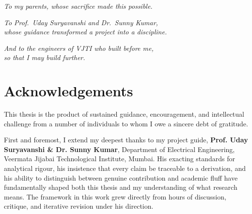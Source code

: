\documentclass[12pt, oneside, a4paper]{report}
\theoremstyle{definition}
\theoremstyle{remark}
\begin{document}

\cleardoublepage


\thispagestyle{empty}
\vspace*{4cm}

\begin{center}
  \itshape
  \large

  \emph{To my parents, whose sacrifice made this possible.}

  \vspace{0.5cm}

  \emph{To Prof.\ Uday Suryavanshi and Dr.\ Sunny Kumar,}\\
  \emph{whose guidance transformed a project into a discipline.}

  \vspace{0.5cm}

  \emph{And to the engineers of VJTI who built before me,}\\
  \emph{so that I may build further.}
\end{center}


\cleardoublepage


\chapter*{Acknowledgements}

This thesis is the product of sustained guidance, encouragement, and intellectual challenge from a number of individuals to whom I owe a sincere debt of gratitude.

\medskip

First and foremost, I extend my deepest thanks to my project guide, \textbf{Prof. Uday Suryavanshi \& Dr. Sunny Kumar}, Department of Electrical Engineering, Veermata Jijabai Technological Institute, Mumbai. His exacting standards for analytical rigour, his insistence that every claim be traceable to a derivation, and his ability to distinguish between genuine contribution and academic fluff have fundamentally shaped both this thesis and my understanding of what research means. The framework in this work grew directly from hours of discussion, critique, and iterative revision under his direction.
\end{document}
